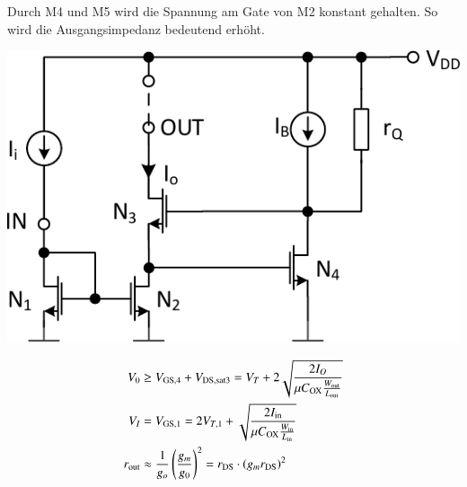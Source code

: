 Durch M4 und M5 wird die Spannung am Gate von M2 konstant gehalten. %
So wird die Ausgangsimpedanz bedeutend erhöht.


\begin{minipage}[t]{0.46\columnwidth}
    \includegraphics[width=\columnwidth, align=t]{images/06_stormspiegel_geregelte_kaskode.pdf}

\end{minipage}
\hfill
\begin{minipage}[t]{0.52\columnwidth}

    \vspace{-0.4cm}

    \begin{align*}
        V_0         &\geq V_{\rm GS,4} + V_{\rm DS,sat3} = V_T + 2 \sqrt{ \frac{2 I_O}{\mu C_{\rm OX} \frac{W_{\rm out}}{L_{\rm out}}} }                                                                                           \\
        V_I         &= V_{\rm GS,1} = 2 V_{T,1} + \sqrt{ \frac{2 I_{\rm in}}{\mu C_{\rm OX} \frac{W_{\rm in}}{L_{\rm in}}} }                                                                                                                                     \\
        r_{\rm out} &\approx \frac{1}{g_o} \left( \frac{g_m}{g_0} \right)^2 = r_{\rm DS} \cdot (g_m r_{\rm DS})^2
    \end{align*}
\end{minipage}


